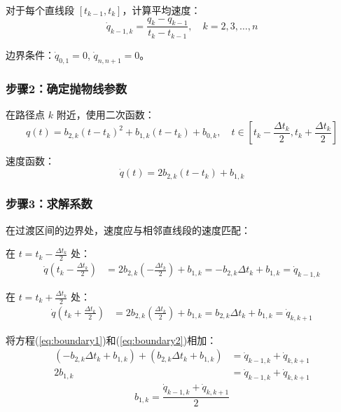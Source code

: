 \documentclass[12pt,a4paper]{article}
\begin{document}
对于每个直线段 $[t_{k-1}, t_k]$，计算平均速度：
\begin{equation}
\dot{q}_{k-1,k} = \frac{q_k - q_{k-1}}{t_k - t_{k-1}}, \quad k = 2, 3, \dots, n
\label{eq:linear_velocity}
\end{equation}

边界条件：$\dot{q}_{0,1} = 0$, $\dot{q}_{n,n+1} = 0$。

\subsubsection{步骤2：确定抛物线参数}

在路径点 $k$ 附近，使用二次函数：
\begin{equation}
q(t) = b_{2,k} (t - t_k)^2 + b_{1,k} (t - t_k) + b_{0,k}, \quad t \in [t_k - \frac{\Delta t_k}{2}, t_k + \frac{\Delta t_k}{2}]
\label{eq:quadratic}
\end{equation}

速度函数：
\begin{equation}
\dot{q}(t) = 2b_{2,k} (t - t_k) + b_{1,k}
\label{eq:quadratic_velocity}
\end{equation}

\subsubsection{步骤3：求解系数}

在过渡区间的边界处，速度应与相邻直线段的速度匹配：

在 $t = t_k - \frac{\Delta t_k}{2}$ 处：
\begin{align}
\dot{q}(t_k - \frac{\Delta t_k}{2}) &= 2b_{2,k}(-\frac{\Delta t_k}{2}) + b_{1,k} = -b_{2,k}\Delta t_k + b_{1,k} = \dot{q}_{k-1,k}
\label{eq:boundary1}
\end{align}

在 $t = t_k + \frac{\Delta t_k}{2}$ 处：
\begin{align}
\dot{q}(t_k + \frac{\Delta t_k}{2}) &= 2b_{2,k}(\frac{\Delta t_k}{2}) + b_{1,k} = b_{2,k}\Delta t_k + b_{1,k} = \dot{q}_{k,k+1}
\label{eq:boundary2}
\end{align}

将方程(\ref{eq:boundary1})和(\ref{eq:boundary2})相加：
\begin{align*}
(-b_{2,k}\Delta t_k + b_{1,k}) + (b_{2,k}\Delta t_k + b_{1,k}) &= \dot{q}_{k-1,k} + \dot{q}_{k,k+1} \\
2b_{1,k} &= \dot{q}_{k-1,k} + \dot{q}_{k,k+1}
\end{align*}
\begin{equation}
\boxed{
b_{1,k} = \frac{\dot{q}_{k-1,k} + \dot{q}_{k,k+1}}{2}
}
\label{eq:b1}
\end{equation}
\end{document}
